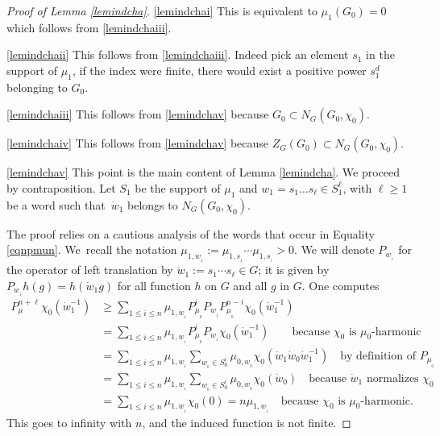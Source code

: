 \documentclass[JEP,XML,SOM,Unicode]{cedram}
\theoremstyle{definition}
\begin{document}
\skpt
\begin{proof}[Proof of Lemma \ref{lemindcha}]
\eqref{lemindchai} This is equivalent to $\mu_1(G_0)=0$ which follows from \eqref{lemindchaiii}.

\eqref{lemindchaii} This follows from \eqref{lemindchaiii}. Indeed pick an element $s_1$
in the support of $\mu_1$, if the index were finite, there would exist a
positive power
$s_1^d$ belonging to $G_0$.

\eqref{lemindchaiii} This follows from \eqref{lemindchav} because $G_0\subset N_G(G_0,\chi_0)$.

\eqref{lemindchaiv} This follows from \eqref{lemindchav} because $Z_G(G_0)\subset N_G(G_0,\chi_0)$.

\eqref{lemindchav} This point is the main content of Lemma \ref{lemindcha}. We proceed by contraposition.
Let $S_1$ be the support of $\mu_1$ and
$w_1=s_1\ldots s_\ell\in S_1^\ell$, with $\ell\geq 1$ be a word
such that~$\dot{w}_{1}$ belongs to $N_G(G_0,\chi_0)$.

The proof relies on a cautious analysis of the words that occur in Equality \eqref{eqnpmun}.
We~recall the notation
$\mu_{1,w_{_1}}:=\mu_{1,s_{_1}}\!\cdots\mu_{1,s_{_\ell}}>0$.
We will denote $P_{w_{_1}}$ for the operator
of left translation by $\dot{w}_{1}:=s_1\cdots s_\ell\in G$; it is given by
$P_{w_{_1}}h(g)=h(\dot{w}_{1}g)$ for all function $h$ on $G$ and all $g$ in $G$.
One computes
\begin{align*}
P_\mu^{n+\ell}\chi_0(\dot{w}_{1}^{-1})
&\geq \sum_{1\leq i\leq n}
\mu_{1,w_{_1}} P^i_{\mu_{_0}}P_{w_{_1}}P^{n-i}_{\mu_{_0}}\chi_0(\dot{w}_{1}^{-1})\\
&= \sum_{1\leq i\leq n}
\mu_{1,w_{_1}} P^i_{\mu_{_0}}P_{w_{_1}}\chi_0(\dot{w}_{1}^{-1})
\hspace{2em}\text{because $\chi_0$ is $\mu_0$-harmonic}\\
&= \sum_{1\leq i\leq n} \mu_{1,w_{_1}}
\sum_{w_{_0}\in S_0^i}\mu_{0,w_{_0}}
\chi_0(\dot{w}_{1}\dot{w}_{0}\dot{w}_{1}^{-1})
\hspace{1em}\text{by definition of $P_{\mu_{_0}}$}\\
&= \sum_{1\leq i\leq n} \mu_{1,w_{_1}}
\sum_{w_{_0}\in S_0^i}\mu_{0,w_{_0}}
\chi_0(\dot{w}_{0})
\hspace{1em}\text{because $\dot{w}_{1}$ normalizes $\chi_0$}\\
&= \sum_{1\leq i\leq n} \mu_{1,w_{_1}}
\chi_0(0)= n\mu_{1,w_{_1}}
\hspace{1em}\text{because $\chi_0$ is $\mu_0$-harmonic.}
\end{align*}
This goes to infinity with $n$, and the induced function is not finite.
\end{proof}
\end{document}
